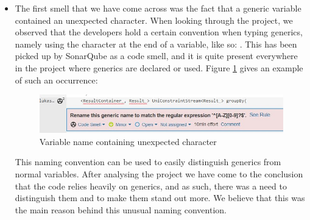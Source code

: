             \begin{itemize}
                \item The first smell that we have come across was the fact that a generic variable contained an unexpected character. When looking through the project, we observed that the developers hold a certain convention when typing generics, namely using the character \cb{$\_$} at the end of a variable, like so: . This has been picked up by SonarQube as a code smell, and it is quite present everywhere in the project where generics are declared or used. Figure \ref{fig:smell4} gives an example of such an occurrence: 
                \begin{figure}[H]
                    \centering
                    \includegraphics{steps/smell4.JPG}
                    \caption{Variable name containing unexpected character}
                    \label{fig:smell4}
                \end{figure}
                This naming convention can be used to easily distinguish generics from normal variables. After analysing the project we have come to the conclusion that the code relies heavily on generics, and as such, there was a need to distinguish them and to make them stand out more. We believe that this was the main reason behind this unusual naming convention.
                

\end{itemize}
